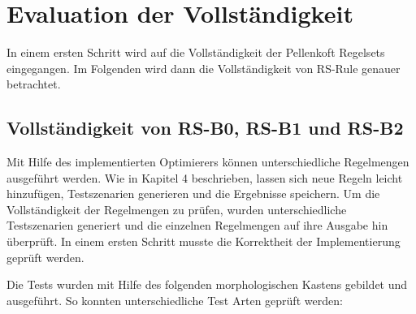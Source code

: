 \section{Evaluation der Vollständigkeit}

In einem ersten Schritt wird auf die Vollständigkeit der Pellenkoft Regelsets eingegangen. Im Folgenden wird dann die Vollständigkeit von RS-Rule genauer betrachtet.

\subsection{Vollständigkeit von RS-B0, RS-B1 und RS-B2}

Mit Hilfe des implementierten Optimierers können unterschiedliche Regelmengen ausgeführt werden. Wie in Kapitel 4 beschrieben, lassen sich neue Regeln leicht hinzufügen, Testszenarien generieren und die Ergebnisse speichern. Um die Vollständigkeit der Regelmengen zu prüfen, wurden unterschiedliche Testszenarien generiert und die einzelnen Regelmengen auf ihre Ausgabe hin überprüft. In einem ersten Schritt musste die Korrektheit der Implementierung geprüft werden.

Die Tests wurden mit Hilfe des folgenden morphologischen Kastens gebildet und ausgeführt. So konnten unterschiedliche Test Arten geprüft werden:

\begin{table}[h]
\centering
{}
\caption{Morthologischer Kasten zur Test Generierung}
\label{my-label}
\end{table}

